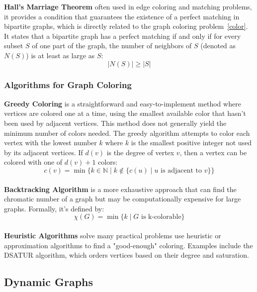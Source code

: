 \documentclass[12pt]{article}
\begin{document}
    \textbf{Hall's Marriage Theorem} often used in edge coloring and matching problems, it provides a condition
    that guarantees the existence of a perfect matching in bipartite graphs,
    which is directly related to the graph coloring problem~\ref{color}.
    It states that a bipartite graph has a perfect matching if and only if for every
    subset \( S \) of one part of the graph, the number of neighbors of \( S \)
    (denoted as \( N(S) \)) is at least as large as \( S \):
    \begin{equation}
            |N(S)| \geq |S|
    \end{equation}

    \subsubsection{Algorithms for Graph Coloring}

    \textbf{Greedy Coloring} is a straightforward and easy-to-implement method where
    vertices are colored one at a time, using the smallest available color that
    hasn’t been used by adjacent vertices. This method does not generally yield
    the minimum number of colors needed. The greedy algorithm attempts to color
    each vertex with the lowest number \( k \) where \( k \) is the smallest
    positive integer not used by its adjacent vertices. If \( d(v) \) is the
    degree of vertex \( v \), then a vertex can be colored with one
    of \( d(v) + 1 \) colors:
    \begin{equation}
        c(v) = \min \{ k \in \mathbb{N} \mid k \notin \{c(u) \mid u \text{ is adjacent to } v\}\}
    \end{equation}
    \\
    \textbf{Backtracking Algorithm} is a more exhaustive approach that can find the
    chromatic number of a graph but may be computationally expensive for large graphs.
    Formally, it's defined by:
    \begin{equation}
        \chi(G) = \min \{k \mid G \text{ is k-colorable} \}
    \end{equation}
    \\
    \textbf{Heuristic Algorithms} solve many practical problems use heuristic or
    approximation algorithms to find a "good-enough" coloring. Examples include
    the DSATUR algorithm, which orders vertices based on their degree and
    saturation.

    \subsection{Dynamic Graphs}
\end{document}
